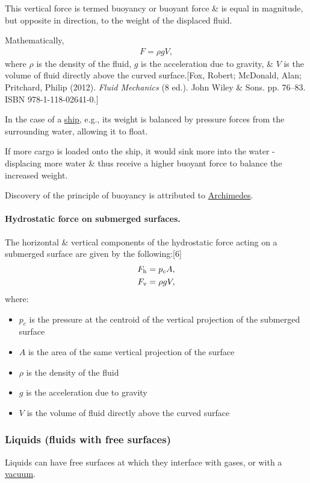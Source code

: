 \documentclass{article}
\begin{document}
This vertical force is termed buoyancy or buoyant force \& is equal in magnitude, but opposite in direction, to the weight of the displaced fluid.

Mathematically,
\begin{align*}
	F = \rho gV,
\end{align*}
where $\rho$ is the density of the fluid, $g$ is the acceleration due to gravity, \& $V$ is the volume of fluid directly above the curved surface.[Fox, Robert; McDonald, Alan; Pritchard, Philip (2012). {\it Fluid Mechanics} (8 ed.). John Wiley \& Sons. pp. 76--83. ISBN 978-1-118-02641-0.]

In the case of a \href{https://en.wikipedia.org/wiki/Ship}{ship}, e.g., its weight is balanced by pressure forces from the surrounding water, allowing it to float.

If more cargo is loaded onto the ship, it would sink more into the water - displacing more water \& thus receive a higher buoyant force to balance the increased weight.

%
Discovery of the principle of buoyancy is attributed to \href{https://en.wikipedia.org/wiki/Archimedes}{Archimedes}. 

\paragraph{Hydrostatic force on submerged surfaces.} The horizontal \& vertical components of the hydrostatic force acting on a submerged surface are given by the following:[6]
\begin{align*}
	F_{\rm h} &= p_cA,\\
	F_{\rm v} &= \rho gV,
\end{align*}
where:
\begin{itemize}
	\item $p_c$ is the pressure at the centroid of the vertical projection of the submerged surface
	\item $A$ is the area of the same vertical projection of the surface
	\item $\rho$ is the density of the fluid
	\item $g$ is the acceleration due to gravity
	\item $V$ is the volume of fluid directly above the curved surface
\end{itemize}

\subsubsection{Liquids (fluids with free surfaces)}
Liquids can have free surfaces at which they interface with gases, or with a \href{https://en.wikipedia.org/wiki/Vacuum}{vacuum}.
\end{document}

